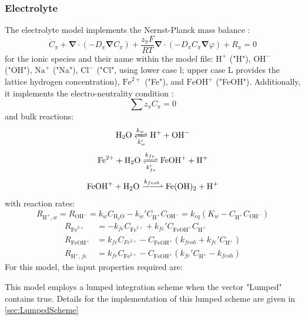 \documentclass[3p]{elsarticle} %
\begin{document}
\subsubsection{Electrolyte}
The electrolyte model implements the Nernst-Planck mass balance \citep{Planck1890}:
\begin{equation}
    \dot{C}_{\pi}+\bm{\nabla}\cdot\left(-D_\pi \bm{\nabla}C_\pi\right) + \frac{z_\pi F}{RT} \bm{\nabla} \cdot \left(-D_\pi C_\pi \bm{\nabla} \varphi\right) +R_\pi = 0 
\end{equation}
for the ionic species and their name within the model file: $\mathrm{H}^+$ ("H"), $\mathrm{OH}^-$ ("OH"), $\mathrm{Na}^+$ ("Na"), $\mathrm{Cl}^-$ ("Cl", using lower case l; upper case L provides the lattice hydrogen concentration), $\mathrm{Fe}^{2+}$ ("Fe"), and $\mathrm{FeOH}^{+}$ ("FeOH"). Additionally, it implements the electro-neutrality condition \citep{Sarkar2011, Feldberg2000}:
\begin{equation}
	\sum z_\pi C_\pi = 0
\end{equation}
and bulk reactions:
\begin{equation}
    \mathrm{H}_2\mathrm{O} \xrightleftharpoons[k_{w}']{k_{w}} \mathrm{H}^+ + \mathrm{OH}^- \label{react:water}
\end{equation}
\begin{equation}
    \mathrm{Fe}^{2+} + \mathrm{H}_2\mathrm{O} \xrightleftharpoons[k_{fe}']{k_{fe}} \mathrm{FeOH}^+ + \mathrm{H}^+ \label{react:fe_feoh}
\end{equation}
\begin{equation}
    \mathrm{FeOH}^{+} + \mathrm{H}_2\mathrm{O} \xrightharpoonup{k_{feoh}} \mathrm{Fe}(\mathrm{OH})_2 + \mathrm{H}^+ \label{react:feoh_feoh2}
\end{equation}
with reaction rates:
\begin{equation}
    R_{\mathrm{H}^+,w}=R_{\mathrm{OH}^-} = k_{w}C_{\mathrm{H}_2\mathrm{O}} - k_{w}'C_{\mathrm{H}^+}C_{\mathrm{OH}^-}  = k_{eq} \left(K_w-C_{\mathrm{H}^+} C_{\mathrm{OH}^-} \right) \label{eq:water_react}
\end{equation}
\begin{align}
    R_{\mathrm{Fe}^{2+}}&=-k_{fe}C_{\mathrm{Fe}^{2+}}+k_{fe}'C_{\mathrm{FeOH}^+}C_{\mathrm{H}^+} \\
    R_{\mathrm{FeOH}^+}&=k_{fe}C_{Fe^{2+}}-C_{\mathrm{FeOH}^+}(k_{feoh}+k_{fe}'C_{\mathrm{H}^+})\\
    R_{\mathrm{H}^+,fe}&=k_{fe}C_{\mathrm{Fe}^{2+}}-C_{\mathrm{FeOH}^+}(k_{fe}'C_{\mathrm{H}^+}-k_{feoh}) \label{eq:H_Part2}
\end{align}
For this model, the input properties required are:

This model employs a lumped integration scheme when the vector "Lumped" contains true. Details for the implementation of this lumped scheme are given in \cref{sec:LumpedScheme}
\end{document}
